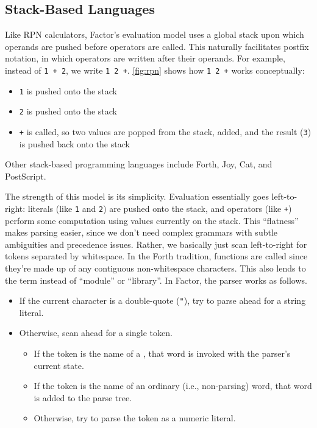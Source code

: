 \subsection{Stack-Based Languages}\label{sec:primer:stack-based}


Like \gls{RPN} calculators, Factor's evaluation model uses a global stack upon
which operands are pushed before operators are called.  This naturally
facilitates postfix notation, in which operators are written after their
operands.  For example, instead of \texttt{1~+~2}, we write \texttt{1~2~+}.
\vref{fig:rpn} shows how \texttt{1~2~+} works conceptually:
\begin{itemize}
  \item \texttt{1} is pushed onto the stack
  \item \texttt{2} is pushed onto the stack
  \item \texttt{+} is called, so two values are popped from the stack, added,
        and the result (\texttt{3}) is pushed back onto the stack
\end{itemize}
Other stack-based programming languages include Forth,
Joy, Cat, and PostScript.

The strength of this model is its simplicity.  Evaluation essentially goes
left-to-right: literals (like \texttt{1} and \texttt{2}) are pushed onto the
stack, and operators (like \texttt{+}) perform some computation using values
currently on the stack.  This ``flatness'' makes parsing easier, since we don't
need complex grammars with subtle ambiguities and precedence issues.  Rather,
we basically just scan left-to-right for tokens separated by whitespace.  In
the Forth tradition, functions are called  since they're made up of
any contiguous non-whitespace characters.  This also lends to the term
 instead of ``module'' or ``library''.   In Factor, the parser
works as follows.
\begin{itemize}
  \item If the current character is a double-quote (\texttt{"}), try to
        parse ahead for a string literal.
  \item Otherwise, scan ahead for a single token.
        \begin{itemize}
          \item If the token is the name of a , that word is
                invoked with the parser's current state.
          \item If the token is the name of an ordinary (i.e., non-parsing)
                word, that word is added to the parse tree.
          \item Otherwise, try to parse the token as a numeric literal.
        \end{itemize}
\end{itemize}

